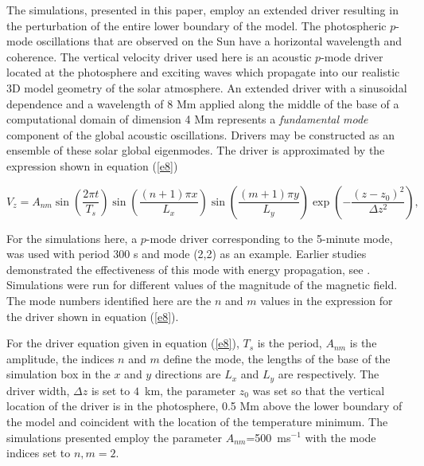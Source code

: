 \documentclass[physics,article,submit,pdftex,moreauthors]{Definitions/mdpi}
\begin{document}
The simulations, presented in this paper, employ an extended driver resulting in the perturbation of the entire lower boundary of the model.  The photospheric $p$-mode oscillations  that are observed on the Sun have a horizontal wavelength and coherence. The vertical velocity driver used here is an acoustic $p$-mode driver located at the photosphere and exciting waves which propagate into our realistic 3D model geometry of the solar atmosphere. An extended driver with a sinusoidal dependence and a wavelength of 8 Mm applied along the middle of the base of a computational domain of dimension 4 Mm represents  a {\it fundamental mode}  component of the global acoustic oscillations. Drivers may be constructed as an ensemble of these solar global eigenmodes. The driver is approximated by the expression shown in equation (\ref{e8}) 


\begin{equation}
 V_{z}  =  A_{nm} \sin\left(\frac{2\pi t}{T_s} \right)\sin\left(  \frac{(n+1)\pi x}{L_x} \right)  
 \sin\left(\frac{(m+1)\pi y}{L_y} \right) \exp\left( -\frac{(z-z_0)^2}{\Delta z^2} \right),
\label{e8}
\end{equation}

For the  simulations here, a $p$-mode driver corresponding to the 5-minute mode, was used with period 300 s and mode (2,2) as an example. Earlier studies demonstrated the effectiveness of this mode with energy propagation, see \cite{Griffiths2018b}. Simulations were run for different values of the magnitude of the magnetic field. The mode numbers identified here are the $n$ and $m$ values in the expression for the driver shown in equation (\ref{e8}).











For the driver equation given in equation (\ref{e8}), $T_{s}$ is the period, $A_{nm}$ is the amplitude, the indices $n$ and $m$ define the mode, the lengths of the base of the simulation box in the $x$ and $y$ directions are $L_{x}$ and $L_{y}$ are  respectively. The driver width, $\Delta z$ is set to $4$~km, the parameter $z_{0}$ was set so that the vertical location of the driver is in the photosphere, 0.5 Mm above the lower boundary of the model and coincident with the location of the temperature minimum. The simulations presented employ the parameter $A_{nm}$=500\, ms$^{-1}$ with the mode indices set to $n,m=2$. 
\end{document}
